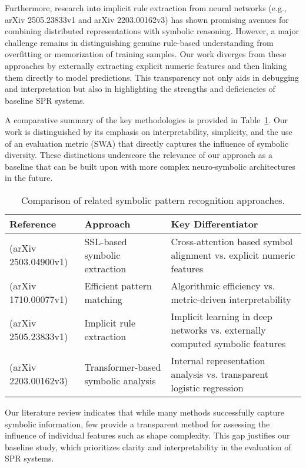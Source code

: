 \documentclass{article}
\begin{document}
Furthermore, research into implicit rule extraction from neural networks (e.g., arXiv 2505.23833v1 and arXiv 2203.00162v3) has shown promising avenues for combining distributed representations with symbolic reasoning. However, a major challenge remains in distinguishing genuine rule-based understanding from overfitting or memorization of training samples. Our work diverges from these approaches by externally extracting explicit numeric features and then linking them directly to model predictions. This transparency not only aids in debugging and interpretation but also in highlighting the strengths and deficiencies of baseline SPR systems.

A comparative summary of the key methodologies is provided in Table~\ref{tab:comp}. Our work is distinguished by its emphasis on interpretability, simplicity, and the use of an evaluation metric (SWA) that directly captures the influence of symbolic diversity. These distinctions underscore the relevance of our approach as a baseline that can be built upon with more complex neuro-symbolic architectures in the future.

\begin{table}[h]
\centering
\begin{tabular}{|l|l|l|}
\hline
\textbf{Reference} & \textbf{Approach} & \textbf{Key Differentiator} \\ \hline
(arXiv 2503.04900v1) & SSL-based symbolic extraction & Cross-attention based symbol alignment vs. explicit numeric features \\ \hline
(arXiv 1710.00077v1) & Efficient pattern matching & Algorithmic efficiency vs. metric-driven interpretability \\ \hline
(arXiv 2505.23833v1) & Implicit rule extraction & Implicit learning in deep networks vs. externally computed symbolic features \\ \hline
(arXiv 2203.00162v3) & Transformer-based symbolic analysis & Internal representation analysis vs. transparent logistic regression \\ \hline
\end{tabular}
\caption{Comparison of related symbolic pattern recognition approaches.}
\label{tab:comp}
\end{table}

Our literature review indicates that while many methods successfully capture symbolic information, few provide a transparent method for assessing the influence of individual features such as shape complexity. This gap justifies our baseline study, which prioritizes clarity and interpretability in the evaluation of SPR systems.
\end{document}

